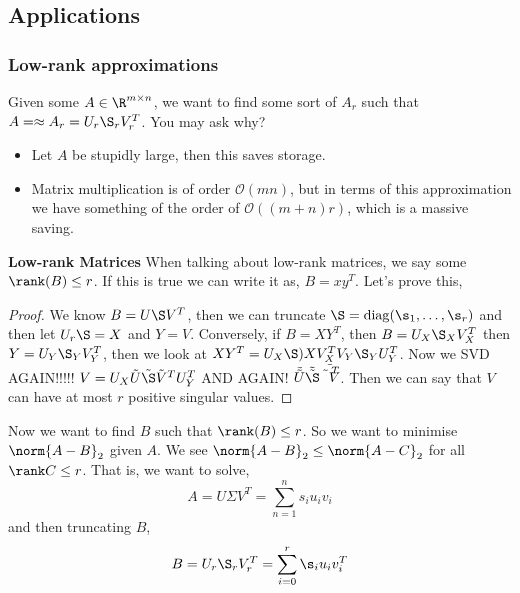 \subsection{Applications}
\subsubsection{Low-rank approximations}
Given some $A \in \R^{m \times n}$, we want to find some sort of $A_r$ such that $A = \approx A_r = U_r \S_r V_r^T$. You may ask why?
\begin{itemize}
  \item Let $A$ be stupidly large, then this saves storage.
  \item Matrix multiplication is of order $\mathcal{O}(mn)$, but in terms of this approximation we have something of the order of $\mathcal{O}((m + n)r)$, which is a massive saving.
\end{itemize}

\noindent
\textbf{Low-rank Matrices}
When talking about low-rank matrices, we say some $\rank(B) \le r$. If this is true we can write it as, $B = xy^T$. Let's prove this,
\begin{proof}
  We know $B = U\S V^T$, then we can truncate $\S = \mathrm{diag}(\s_1, \dots, \s_r)$ and then let $U_r\S = X$ and $Y = V$. Conversely, if $B = XY^T$, then $B = U_X\S_X V_X^T$ then $Y = U_Y \S_Y V_Y^T$, then we look at $XY^T = U_X\S)X V_X^T V_Y \S_Y U_Y^T$. Now we SVD AGAIN!!!!! $V = U_X \tilde{U} \tilde \S \tilde V^T U_Y^T$ AND AGAIN! $\tilde{\tilde U} \tilde{\tilde \S} \tilde{\tilde V^T}$.
  Then we can say that $V$ can have at most $r$ positive singular values.
\end{proof}

\noindent
Now we want to find $B$ such that $\rank(B) \le r$. So we want to minimise $\norm{A - B}_2$ given $A$. We see $\norm{A - B}_2 \le \norm{A - C}_2$ for all $\rank C \le r$. That is, we want to solve,
$$ A = U\Sigma V^T = \sum_{n=1}^n s_i u_i v_i $$
and then truncating $B$,
$$ B = U_r\S_r V_r^T = \sum_{i=0}^r \s_i u_i v_i^T $$